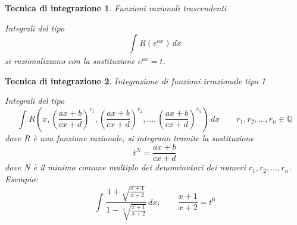 \documentclass[a4paper, titlepage]{report}%
\theoremstyle{definition} %
\theoremstyle{plain}
\theoremstyle{plain}
\theoremstyle{remark}
\theoremstyle{remark}
\theoremstyle{plain}
\theoremstyle{plain}
\theoremstyle{plain}
\theoremstyle{plain}
\theoremstyle{plain}
\newtheorem*{tecnica}{Tecnica di integrazione}
\begin{document}
\begin{tecnica}{Funzioni razionali trascendenti}

   Integrali del tipo 
\[
    \int_{}^{} R(e^{ax}) \,dx         
\]
si razionalizzano con la sostituzione $e^{ax} = t$.
    
\end{tecnica}
\begin{tecnica}{Integrazione di funzioni irrazionale tipo 1}
    
    Integrali del tipo 
    \[
        \int_{}^{} R(x,(\frac{ax+b}{cx+d})^{r_1},
        (\frac{ax+b}{cx+d})^{r_2},...,
        (\frac{ax+b}{cx+d})^{r_n}) \,dx  
        \qquad r_1,r_2,...,r_n \in \mathbb{Q}      
    \]
dove R è una funzione razionale, si integrano tramite la sostituzione
\[
   t^N = \frac{ax+b}{cx+d}    
\]
dove N è il minimo comune multiplo dei denominatori dei numeri
 $r_1,r_2,...,r_n$. \\
Esempio:
\[
    \int_{}^{} \frac{1+\sqrt{\frac{x+1}{x+2}}}{1- \sqrt[3]{
     \frac{x+1}{x+2}}}\, dx , \qquad \frac{x+1}{x+2} = t^6
\]
\end{tecnica}
\end{document}
